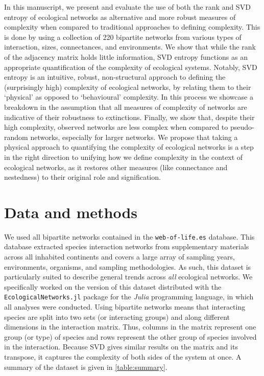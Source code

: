 In this manuscript, we present and evaluate the use of both the rank and SVD
entropy of ecological networks as alternative and more robust measures of
complexity when compared to traditional approaches to defining complexity. This
is done by using a collection of 220 bipartite networks from various types of
interaction, sizes, connectances, and environments. We show that while the rank
of the adjacency matrix holds little information, SVD entropy functions as an
appropriate quantification of the complexity of ecological systems. Notably, SVD
entropy is an intuitive, robust, non-structural approach to defining the
(surprisingly high) complexity of ecological networks, by relating them to their
`physical' as opposed to `behavioural' complexity. In this process we showcase a
breakdown in the assumption that all measures of complexity of networks are
indicative of their robustness to extinctions. Finally, we show that, despite
their high complexity, observed networks are less complex when compared to
pseudo-random networks, especially for larger networks. We propose that taking a
physical approach to quantifying the complexity of ecological networks is a step
in the right direction to unifying how we define complexity in the context of
ecological networks, as it restores other measures (like connectance and
nestedness) to their original role and signification.

\section{Data and methods}\label{data-and-methods}

We used all bipartite networks contained in the \texttt{web-of-life.es}
database. This database extracted species interaction networks from
supplementary materials across all inhabited continents and covers a large array
of sampling years, environments, organisms, and sampling methodologies. As such,
this dataset is particularly suited to describe general trends across \emph{all}
ecological networks. We specifically worked on the version of this dataset
distributed with the \texttt{EcologicalNetworks.jl} package
\cite{Poisot2019EcoJl} for the \emph{Julia} \cite{Bezanson2017JulFre}
programming language, in which all analyses were conducted. Using bipartite
networks means that interacting species are split into two sets (or interacting
groups) and along different dimensions in the interaction matrix. Thus, columns
in the matrix represent one group (or type) of species and rows represent the
other group of species involved in the interaction. Because SVD gives similar
results on the matrix and its transpose, it captures the complexity of both
sides of the system at once. A summary of the dataset is given in
\autoref{table:summary}.

